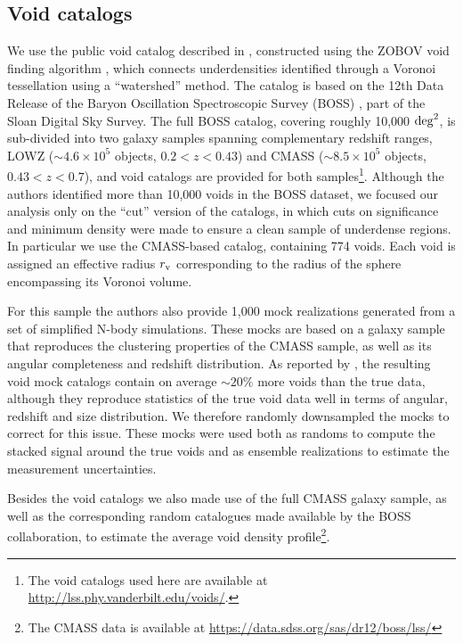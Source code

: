 \documentclass[twocolumn,amsfont,amssymb,amsmath, showpacs,balancelastpage, nofootinbib]{revtex4-1}
\begin{document}
    \subsection{Void catalogs}\label{ssec:data.voids}
      We use the public void catalog described in \cite{2017ApJ...835..161M}, constructed using
      the ZOBOV void finding algorithm \citep{2008MNRAS.386.2101N}, which connects underdensities
      identified through a Voronoi tessellation using a ``watershed'' method. The catalog is based
      on the 12th Data Release of the Baryon Oscillation Spectroscopic Survey (BOSS)
      \cite{2016MNRAS.455.1553R}, part of the Sloan Digital Sky Survey. The full BOSS catalog,
      covering roughly 10,000 ${\rm deg}^2$, is sub-divided into two galaxy samples spanning
      complementary redshift ranges, LOWZ ($\sim4.6\times10^5$ objects, $0.2<z<0.43$) and CMASS
      ($\sim8.5\times10^5$ objects, $0.43<z<0.7$), and void catalogs are provided for both
      samples\footnote{The void catalogs used here
      are available at \url{http://lss.phy.vanderbilt.edu/voids/}.}. Although the authors
      identified more than 10,000 voids in the BOSS dataset, we focused our analysis only on the
      ``cut'' version of the catalogs, in which cuts on significance and minimum density were made
      to ensure a clean sample of underdense regions. In particular we use the CMASS-based catalog,
      containing 774 voids. Each void is assigned an effective radius $r_{\rm v}$ corresponding
      to the radius of the sphere encompassing its Voronoi volume.
      
      For this sample the authors also provide 1,000 mock realizations generated from a set of
      simplified N-body simulations. These mocks are based on a galaxy sample that reproduces
      the clustering properties of the CMASS sample, as well as its angular completeness and
      redshift distribution. As reported by \cite{2017ApJ...835..161M}, the resulting void mock
      catalogs contain on average $\sim20\%$ more voids than the true data, although they
      reproduce statistics of the true void data well in terms of angular, redshift and
      size distribution. We therefore randomly downsampled the mocks to correct for this
      issue. These mocks were used both as randoms to compute the stacked signal around
      the true voids and as ensemble realizations to estimate the measurement uncertainties.
      
      Besides the void catalogs we also made use of the full CMASS galaxy sample, as well as the
      corresponding random catalogues made available by the BOSS collaboration, to estimate the
      average void density profile\footnote{The CMASS data is available at
      \url{https://data.sdss.org/sas/dr12/boss/lss/}}.
      
\end{document}
